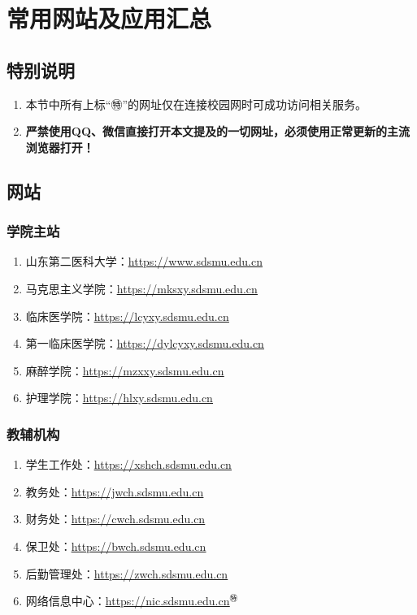 \chapter[常用网站及应用汇总]{常用网站及应用汇总}

\section*{特别说明}
\begin{enumerate}
    \item 本节中所有上标“㊕”的网址仅在连接校园网时可成功访问相关服务。
    \item \textbf{严禁使用QQ、微信直接打开本文提及的一切网址，必须使用正常更新的主流浏览器打开！}
\end{enumerate}

\section[网站]{网站}
\subsection[学院主站]{学院主站}
\begin{enumerate}
    \item 山东第二医科大学：\uline{\href{https://www.sdsmu.edu.cn}{https://www.sdsmu.edu.cn}}
    \item 马克思主义学院：\uline{\href{https://mksxy.sdsmu.edu.cn}{https://mksxy.sdsmu.edu.cn}}
    \item 临床医学院：\uline{\href{https://lcyxy.sdsmu.edu.cn}{https://lcyxy.sdsmu.edu.cn}}
    \item 第一临床医学院：\uline{\href{https://dylcyxy.sdsmu.edu.cn}{https://dylcyxy.sdsmu.edu.cn}}
    \item 麻醉学院：\uline{\href{https://mzxxy.sdsmu.edu.cn}{https://mzxxy.sdsmu.edu.cn}}
    \item 护理学院：\uline{\href{https://hlxy.sdsmu.edu.cn}{https://hlxy.sdsmu.edu.cn}}
\end{enumerate}

\subsection[教辅机构]{教辅机构}
\begin{enumerate}
    \item 学生工作处：\uline{\href{https://xshch.sdsmu.edu.cn}{https://xshch.sdsmu.edu.cn}}
    \item 教务处：\uline{\href{https://jwch.sdsmu.edu.cn}{https://jwch.sdsmu.edu.cn}}
    \item 财务处：\uline{\href{https://cwch.sdsmu.edu.cn}{https://cwch.sdsmu.edu.cn}}
    \item 保卫处：\uline{\href{https://bwch.sdsmu.edu.cn}{https://bwch.sdsmu.edu.cn}}
    \item 后勤管理处：\uline{\href{https://zwch.sdsmu.edu.cn}{https://zwch.sdsmu.edu.cn}}
    \item 网络信息中心：\uline{\href{https://nic.sdsmu.edu.cn}{https://nic.sdsmu.edu.cn}$^㊕$}
\end{enumerate}


